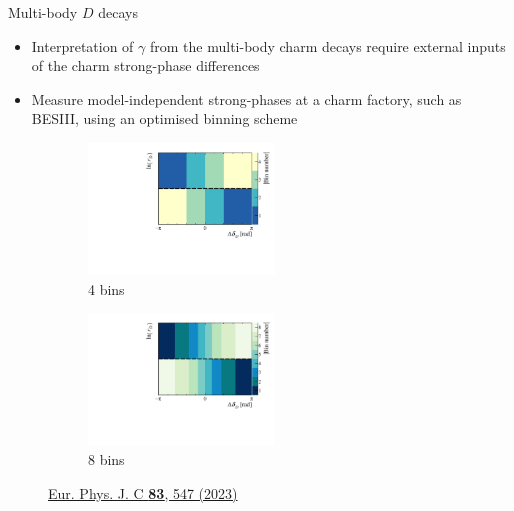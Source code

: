 \documentclass[xcolor={dvipsnames}]{beamer}
\begin{document}
\begin{frame}{Multi-body $D$ decays}
  \begin{itemize}
    \setlength\itemsep{0.5em}
    \item{Interpretation of $\gamma$ from the multi-body charm decays require external inputs of the charm strong-phase differences}
    \item{Measure model-independent strong-phases at a charm factory, such as BESIII, using an optimised binning scheme}
  \end{itemize}
  \begin{figure}
    \centering
    \begin{subfigure}{0.5\textwidth}
      \centering
      \includegraphics[height = 3.5cm]{Plots/BinningSchemePlot_4Bins.pdf}
      \vspace{-0.3cm}
      \caption*{4 bins}
    \end{subfigure}%
    \begin{subfigure}{0.5\textwidth}
      \centering
      \includegraphics[height = 3.5cm]{Plots/BinningSchemePlot_8Bins.pdf}
      \vspace{-0.3cm}
      \caption*{8 bins}
    \end{subfigure}
    \caption*{\tiny\href{https://link.springer.com/article/10.1140/epjc/s10052-023-11560-5}{Eur. Phys. J. C \textbf{83}, 547 (2023)}}
  \end{figure}
\end{frame}
\end{document}
